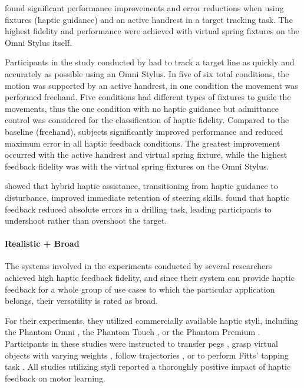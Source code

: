 \cite{Fehlberg2012} found significant performance improvements and error reductions when using fixtures (haptic guidance) and an active handrest in a target tracking task. The highest fidelity and performance were achieved with virtual spring fixtures on the Omni Stylus itself.

Participants in the study conducted by \cite{Fehlberg2012} had to track a target line as quickly and accurately as possible using an Omni Stylus. In five of six total conditions, the motion was supported by an active handrest, in one condition the movement was performed freehand. Five conditions had different types of fixtures to guide the movements, thus the one condition with no haptic guidance but admittance control was considered for the classification of haptic fidelity.
Compared to the baseline (freehand), subjects significantly improved performance and reduced maximum error in all haptic feedback conditions. The greatest improvement occurred with the active handrest and virtual spring fixture, while the highest feedback fidelity was with the virtual spring fixtures on the Omni Stylus.

\cite{LeeH2014} showed that hybrid haptic assistance, transitioning from haptic guidance to disturbance, improved immediate retention of steering skills. \cite{Grant2019} found that haptic feedback reduced absolute errors in a drilling task, leading participants to undershoot rather than overshoot the target.


\paragraph{Realistic + Broad} \label{sec:realisticbroad}
The systems involved in the experiments conducted by several researchers achieved high haptic feedback fidelity, and since their system can provide haptic feedback for a whole group of use cases to which the particular application belongs, their versatility is rated as broad.

For their experiments, they utilized commercially available haptic styli, including the Phantom Omni \cite{Brickler2019, Fehlberg2012}, the Phantom Touch \cite{Gunter2022}, or the Phantom Premium \cite{Rodriguez2010, Wall2000}. Participants in these studies were instructed to transfer pegs \cite{Brickler2019}, grasp virtual objects with varying weights \cite{Gunter2022}, follow trajectories \cite{Fehlberg2012, Rodriguez2010}, or to perform Fitts' tapping task \cite{Wall2000, Fitts1954TheMovement}. All studies utilizing styli reported a thoroughly positive impact of haptic feedback on motor learning.

